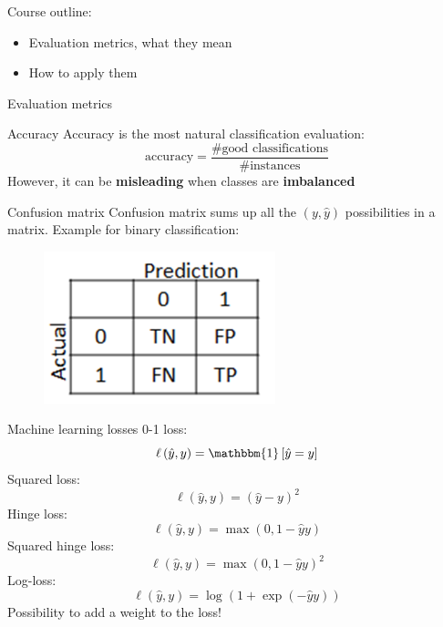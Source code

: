 \documentclass{beamer}
\newcommand{\1}[1]{\mathbbm{1}\left[#1\right]}
\begin{document}
\begin{frame}
Course outline:
\begin{itemize}
	\item Evaluation metrics, what they mean
	\item How to apply them
\end{itemize}
\end{frame}

\begin{frame}
\begin{center}
\Huge{Evaluation metrics}
\end{center}
\end{frame}

\begin{frame}{Accuracy}
Accuracy is the most natural classification evaluation:
$$ \text{accuracy} = \dfrac{\# \text{good classifications}}{\# \text{instances}}$$
\vfill
\pause
However, it can be \textbf{misleading} when classes are \textbf{imbalanced}
\end{frame}

\begin{frame}{Confusion matrix}
Confusion matrix sums up all the $(y, \hat{y})$ possibilities in a matrix. Example for binary classification:
\begin{figure}
\centering
\includegraphics[width=0.6\textwidth]{images/confusion_matrix.png}
\end{figure}
\end{frame}

\begin{frame}{Machine learning losses}
0-1 loss:
$$ \ell \left( \hat{y}, y \right) = \1{\hat{y} = y}$$
\vfill
\pause
Squared loss:
$$ \ell \left( \hat{y}, y \right) = \left( \hat{y} - y\right)^2$$
\vfill
\pause
Hinge loss:
$$ \ell \left( \hat{y}, y \right) = \max\left(0, 1 - \hat{y} y\right)$$
\vfill
\pause
Squared hinge loss:
$$ \ell \left( \hat{y}, y \right) = \max\left(0, 1 - \hat{y} y\right)^2 $$
\vfill
\pause
Log-loss:
$$ \ell \left( \hat{y}, y \right) = \log \left( 1 + \exp ( - \hat{y}y )\right) $$
\vfill
\pause
Possibility to add a weight to the loss!

\end{frame}
\end{document}
